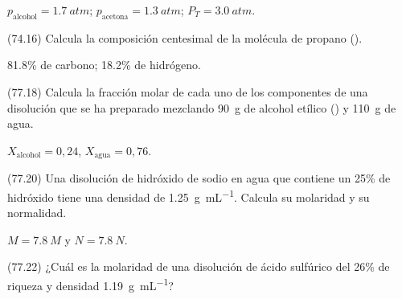     \begin{solution}
      \( p_\textrm{alcohol} = \SI{1.7}{atm} \);
      \( p_\textrm{acetona} = \SI{1.3}{atm} \);
      \( P_T = \SI{3.0}{atm} \).
    \end{solution}




    \begin{exercise}[
        tags    = {},
        topics  = {química,química básica},
        source  = {FQ 1B MGH 2016, p74, e16},
      ]
      (74.16) Calcula la composición centesimal de la molécula de propano ().
    \end{exercise}

    \begin{solution}
      \num{81,8}\% de carbono; \num{18,2}\% de hidrógeno.
    \end{solution}




    \begin{exercise}[
        tags    = {},
        topics  = {química,química básica},
        source  = {FQ 1B MGH 2016, p77, e18},
      ]
      (77.18) Calcula la fracción molar de cada uno de los componentes
      de una disolución que se ha preparado mezclando \SI{90}{\gram} de alcohol etílico () y \SI{110}{\gram} de agua.
    \end{exercise}

    \begin{solution}
      \( X_\textrm{alcohol} = 0,24 \),
      \( X_\textrm{agua} = 0,76 \).
    \end{solution}




    \begin{exercise}[
        tags    = {},
        topics  = {química,química básica},
        source  = {FQ 1B MGH 2016, p77, e20},
      ]
      (77.20) Una disolución de hidróxido de sodio en agua que contiene un 25\% de hidróxido tiene una densidad de \SI{1.25}{\gram\per\milli\liter}. Calcula
      su molaridad y su normalidad.
    \end{exercise}

    \begin{solution}
      \( M = \SI{7.8}{M} \)  y  \( N = \SI{7.8}{N} \).
    \end{solution}




    \begin{exercise}[
        tags    = {},
        topics  = {química,química básica},
        source  = {FQ 1B MGH 2016, p77, e22},
      ]
      (77.22) ¿Cuál es la molaridad de una disolución de ácido sulfúrico
      del 26\% de riqueza y densidad \SI{1.19}{\gram\per\milli\liter}?
    \end{exercise}

